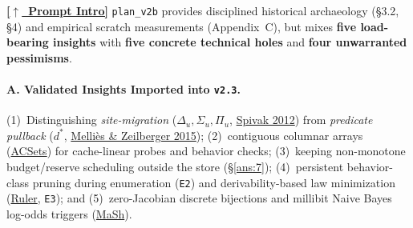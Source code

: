 \documentclass[12pt]{article}
\newcommand{\litref}[2]{\hyperlink{lit:#1}{\textcolor{citegreen}{#2}}}
\newcommand{\secback}[2]{\hyperref[#1]{\textcolor{linkblue}{\textbf{\small[\(\uparrow\)~#2]}}}}
\begin{document}
\secback{sec:verbatim-prompt}{Prompt Intro} \texttt{plan\_v2b} provides disciplined historical archaeology (\S3.2, \S4) and empirical scratch measurements (Appendix~C), but mixes \textbf{five load-bearing insights} with \textbf{five concrete technical holes} and \textbf{four unwarranted pessimisms}.

\paragraph{A. Validated Insights Imported into \texttt{v2.3}.}
(1)~Distinguishing \emph{site-migration} ($\Delta_u, \Sigma_u, \Pi_u$, \litref{spivak2012}{Spivak 2012}) from \emph{predicate pullback} ($d^*$, \litref{mellies2015}{Melli\`es \& Zeilberger 2015});
(2)~contiguous columnar arrays (\litref{patterson2022}{ACSets}) for cache-linear probes and behavior checks;
(3)~keeping non-monotone budget/reserve scheduling outside the store (\S\ref{ans:7});
(4)~persistent behavior-class pruning during enumeration (\texttt{E2}) and derivability-based law minimization (\litref{nandi2021}{Ruler}, \texttt{E3}); and
(5)~zero-Jacobian discrete bijections and millibit Naive Bayes log-odds triggers (\litref{kuhlwein2013}{MaSh}).
\end{document}
